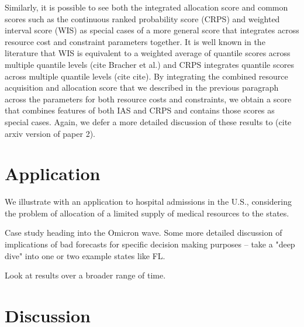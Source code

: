 \documentclass{article}
\begin{document}
Similarly, it is possible to see both the integrated allocation score and common scores such as the  continuous ranked probability score (CRPS) and weighted interval score (WIS) as special cases of a more general score that integrates across resource cost and constraint parameters together. It is well known in the literature that WIS is equivalent to a weighted average of quantile scores across multiple quantile levels (cite Bracher et al.) and CRPS integrates quantile scores across multiple quantile levels (cite cite). By integrating the combined resource acquisition and allocation score that we described in the previous paragraph across the parameters for both resource costs and constraints, we obtain a score that combines features of both IAS and CRPS and contains those scores as special cases. Again, we defer a more detailed discussion of these results to (cite arxiv version of paper 2).


\section{Application}
\label{sec:application}

We illustrate with an application to hospital admissions in the U.S., considering the problem of allocation of a limited supply of medical resources to {}the states.

Case study heading into the Omicron wave. Some more detailed discussion of implications of bad forecasts for specific decision making purposes -- take a "deep dive" into one or two example states like FL.

Look at results over a broader range of time.

\section{Discussion}
\label{sec:discussion}
\end{document}
